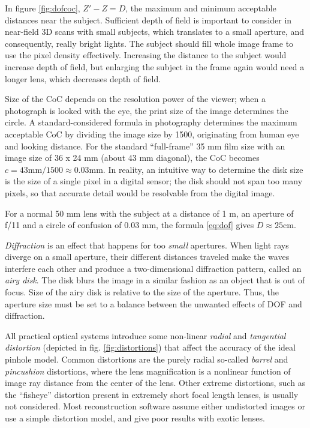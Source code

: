 In figure \ref{fig:dofcoc}, $Z' - Z = D$, the maximum and minimum acceptable distances near the subject.
Sufficient depth of field is important to consider in near-field 3D scans with small subjects, which translates to a small aperture, and consequently, really bright lights.
The subject should fill whole image frame to use the pixel density effectively.
Increasing the distance to the subject would increase depth of field, but enlarging the subject in the frame again would need a longer lens, which decreases depth of field.

Size of the CoC depends on the resolution power of the viewer; when a photograph is looked with the eye, the print size of the image determines the circle.
A standard-considered formula in photography determines the maximum acceptable CoC by dividing the image size by 1500, originating from human eye and looking distance.
For the standard ``full-frame'' 35 mm film size with an image size of 36 x 24 mm (about 43 mm diagonal), the CoC becomes $c = 43 \text{mm} / 1500 \approx 0.03 \text{mm}$.
In reality, an intuitive way to determine the disk size is the size of a single pixel in a digital sensor;
the disk should not span too many pixels, so that accurate detail would be resolvable from the digital image.

For a normal 50 mm lens with the subject at a distance of 1 m, an aperture of f/11 and a circle of confusion of 0.03 mm, the formula \ref{eq:dof} gives $D \approx 25 \text{cm}$. %


\emph{Diffraction} is an effect that happens for too \emph{small} apertures.
When light rays diverge on a small aperture, their different distances traveled make the waves interfere each other and produce a two-dimensional diffraction pattern, called an \emph{airy disk}.
The disk blurs the image in a similar fashion as an object that is out of focus.
Size of the airy disk is relative to the size of the aperture.
Thus, the aperture size must be set to a balance between the unwanted effects of DOF and diffraction.


All practical optical systems introduce some non-linear \emph{radial} and \emph{tangential distortion} (depicted in fig. \ref{fig:distortions}) that affect the accuracy of the ideal pinhole model.
Common distortions are the purely radial so-called \emph{barrel} and \emph{pincushion} distortions, where the lens magnification is a nonlinear function of image ray distance from the center of the lens. \cite{brown1966decentering}
Other extreme distortions, such as the ``fisheye'' distortion present in extremely short focal length lenses, is usually not considered.
Most reconstruction software assume either undistorted images or use a simple distortion model, and give poor results with exotic lenses.

